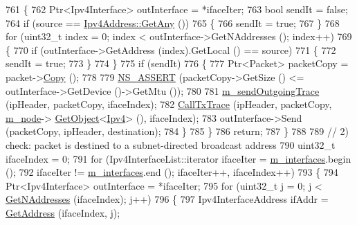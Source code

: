 \begin{DoxyCode}
761         \{
762           Ptr<Ipv4Interface> outInterface = *ifaceIter;
763           \textcolor{keywordtype}{bool} sendIt = \textcolor{keyword}{false};
764           \textcolor{keywordflow}{if} (source == \hyperlink{classns3_1_1Ipv4Address_a7a39b330c8e701183a411d5779fca1a4}{Ipv4Address::GetAny} ())
765             \{
766               sendIt = \textcolor{keyword}{true};
767             \}
768           \textcolor{keywordflow}{for} (uint32\_t index = 0; index < outInterface->GetNAddresses (); index++)
769             \{
770               \textcolor{keywordflow}{if} (outInterface->GetAddress (index).GetLocal () == source)
771                 \{
772                   sendIt = \textcolor{keyword}{true};
773                 \}
774             \}
775           \textcolor{keywordflow}{if} (sendIt)
776             \{
777               Ptr<Packet> packetCopy = packet->\hyperlink{classns3_1_1Packet_a5d5c70802a5f77fc5f0001e0cfc1898b}{Copy} ();
778 
779               \hyperlink{assert_8h_a6dccdb0de9b252f60088ce281c49d052}{NS\_ASSERT} (packetCopy->GetSize () <= outInterface->GetDevice ()->GetMtu ());
780 
781               \hyperlink{classns3_1_1Ipv4L3Protocol_a909297aa7ca87db2b7c91daefa2ed40a}{m\_sendOutgoingTrace} (ipHeader, packetCopy, ifaceIndex);
782               \hyperlink{classns3_1_1Ipv4L3Protocol_a04cbb7540c6f22a2870f118715b6a703}{CallTxTrace} (ipHeader, packetCopy, \hyperlink{classns3_1_1Ipv4L3Protocol_ad2cc5076c247724f1e99b398edc1965a}{m\_node}->
      \hyperlink{classns3_1_1Object_a13e18c00017096c8381eb651d5bd0783}{GetObject}<\hyperlink{classns3_1_1Ipv4_a1c15284fe630c76e0c9c75a97f1ff234}{Ipv4}> (), ifaceIndex);
783               outInterface->Send (packetCopy, ipHeader, destination);
784             \}
785         \}
786       \textcolor{keywordflow}{return};
787     \}
788 
789   \textcolor{comment}{// 2) check: packet is destined to a subnet-directed broadcast address}
790   uint32\_t ifaceIndex = 0;
791   \textcolor{keywordflow}{for} (Ipv4InterfaceList::iterator ifaceIter = \hyperlink{classns3_1_1Ipv4L3Protocol_a0b0f15b24a02f2c9a5d576f633aa2770}{m\_interfaces}.begin ();
792        ifaceIter != \hyperlink{classns3_1_1Ipv4L3Protocol_a0b0f15b24a02f2c9a5d576f633aa2770}{m\_interfaces}.end (); ifaceIter++, ifaceIndex++)
793     \{
794       Ptr<Ipv4Interface> outInterface = *ifaceIter;
795       \textcolor{keywordflow}{for} (uint32\_t j = 0; j < \hyperlink{classns3_1_1Ipv4L3Protocol_ab816ec1b5f680117bc1363b3d9649b22}{GetNAddresses} (ifaceIndex); j++)
796         \{
797           Ipv4InterfaceAddress ifAddr = \hyperlink{classns3_1_1Ipv4L3Protocol_a85fa4287313a773dee29aa73fa74a7e0}{GetAddress} (ifaceIndex, j);

\end{DoxyCode}
